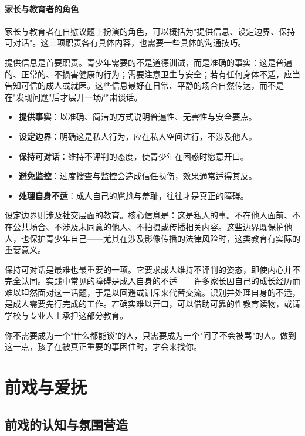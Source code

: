 \documentclass[12pt,UTF8]{ctexbook}
\newcommand{\keyword}[1]{\textbf{#1}}
\begin{document}
\subsection{家长与教育者的角色}

家长与教育者在自慰议题上扮演的角色，可以概括为"提供信息、设定边界、保持可对话"。这三项职责各有具体内容，也需要一些具体的沟通技巧。

提供信息是首要职责。青少年需要的不是道德训诫，而是准确的事实：这是普遍的、正常的、不损害健康的行为；需要注意卫生与安全；若有任何身体不适，应当告知可信的成人或就医。这些信息最好在日常、平静的场合自然传达，而不是在"发现问题"后才展开一场严肃谈话。

\begin{itemize}
	\item \keyword{提供事实}：以准确、简洁的方式说明普遍性、无害性与安全要点。
	\item \keyword{设定边界}：明确这是私人行为，应在私人空间进行，不涉及他人。
	\item \keyword{保持可对话}：维持不评判的态度，使青少年在困惑时愿意开口。
	\item \keyword{避免监控}：过度搜查与监控会造成信任损伤，效果通常适得其反。
	\item \keyword{处理自身不适}：成人自己的尴尬与羞耻，往往才是真正的障碍。
\end{itemize}

设定边界则涉及社交层面的教育。核心信息是：这是私人的事。不在他人面前、不在公共场合、不涉及未同意的他人、不拍摄或传播相关内容。这些边界既保护他人，也保护青少年自己——尤其在涉及影像传播的法律风险时，这类教育有实际的重要意义。

保持可对话是最难也最重要的一项。它要求成人维持不评判的姿态，即使内心并不完全认同。实践中常见的障碍是成人自身的不适——许多家长因自己的成长经历而难以坦然面对这一话题，于是以回避或训斥来代替交流。识别并处理自身的不适，是成人需要先行完成的工作。若确实难以开口，可以借助可靠的性教育读物，或请学校与专业人士承担这部分教育。

\begin{tcolorbox}[colback=pink!5!white,colframe=red!50!black,title=贴心小叮咛]
	你不需要成为一个"什么都能谈"的人，只需要成为一个"问了不会被骂"的人。做到这一点，孩子在被真正重要的事困住时，才会来找你。
\end{tcolorbox}


\part{前戏与爱抚}

\chapter{前戏的认知与氛围营造}
\end{document}
